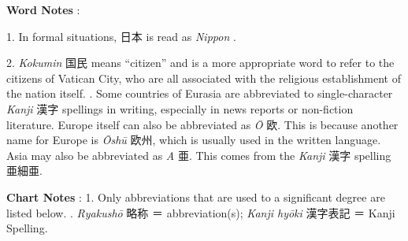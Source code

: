 \par{\textbf{Word Notes }: }

\par{1. In formal situations, 日本 is read as \emph{Nippon }. }

\par{2. \emph{Kokumin }国民 means “citizen” and is a more appropriate word to refer to the citizens of Vatican City, who are all associated with the religious establishment of the nation itself. \hfill{}. Some countries of Eurasia are abbreviated to single-character \emph{Kanji }漢字 spellings in writing, especially in news reports or non-fiction literature. Europe itself can also be abbreviated as \emph{Ō }欧. This is because another name for Europe is \emph{Ōshū }欧州, which is usually used in the written language. Asia may also be abbreviated as \emph{A }亜. This comes from the \emph{Kanji }漢字 spelling 亜細亜. }

\par{\textbf{Chart Notes }: }
1. Only abbreviations that are used to a significant degree are listed below. \hfill{}. \emph{Ryakushō }略称 ＝ abbreviation(s); \emph{Kanji hyōki }漢字表記 ＝ Kanji Spelling. \hfill\break
\hfill\break

